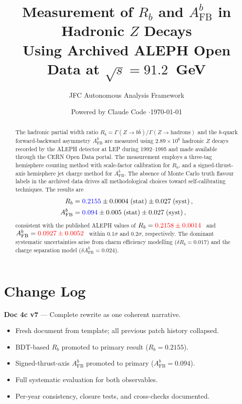 \documentclass[11pt,a4paper]{article}
\title{Measurement of $R_b$ and $A_\mathrm{FB}^b$ in Hadronic $Z$ Decays \\
  Using Archived ALEPH Open Data at $\sqrt{s} = 91.2$~GeV}
\author{JFC Autonomous Analysis Framework}
\date{Powered by Claude Code \quad$\cdot$\quad \today}
\newcommand{\measured}[1]{\textcolor{blue}{#1}}
\newcommand{\external}[1]{\textcolor{red}{#1}}
\begin{document}
\maketitle

\begin{abstract}
The hadronic partial width ratio
$R_b = \Gamma(Z \to b\bar{b}) / \Gamma(Z \to \mathrm{hadrons})$
and the $b$-quark forward-backward asymmetry $A_\mathrm{FB}^b$ are
measured using $2.89 \times 10^6$ hadronic $Z$ decays recorded by the
ALEPH detector at LEP during 1992--1995 and made available through the
CERN Open Data portal.  The measurement employs a three-tag hemisphere
counting method with scale-factor calibration for $R_b$, and a
signed-thrust-axis hemisphere jet charge method for $A_\mathrm{FB}^b$.
The absence of Monte Carlo truth flavour labels in the archived data
drives all methodological choices toward self-calibrating techniques.
The results are
\begin{align*}
  R_b &= \measured{0.2155} \pm 0.0004\;\mathrm{(stat)}
         \pm 0.027\;\mathrm{(syst)}\,,\\
  A_\mathrm{FB}^b &= \measured{0.094} \pm 0.005\;\mathrm{(stat)}
         \pm 0.027\;\mathrm{(syst)}\,,
\end{align*}
consistent with the published ALEPH values of
$R_b = \external{0.2158 \pm 0.0014}$~\cite{ALEPH:Rb:1996} and
$A_\mathrm{FB}^b = \external{0.0927 \pm 0.0052}$~\cite{ALEPH:AFBb}
within $0.1\sigma$ and $0.2\sigma$, respectively.
The dominant systematic uncertainties arise from charm efficiency
modelling ($\delta R_b = 0.017$) and the charge separation model
($\delta A_\mathrm{FB}^b = 0.024$).
\end{abstract}

\tableofcontents
\clearpage

\section*{Change Log}

\textbf{Doc 4c v7} --- Complete rewrite as one coherent narrative.
\begin{itemize}
\item Fresh document from template; all previous patch history collapsed.
\item BDT-based $R_b$ promoted to primary result ($R_b = 0.2155$).
\item Signed-thrust-axis $A_\mathrm{FB}^b$ promoted to primary ($A_\mathrm{FB}^b = 0.094$).
\item Full systematic evaluation for both observables.
\item Per-year consistency, closure tests, and cross-checks documented.
\end{itemize}
\end{document}
